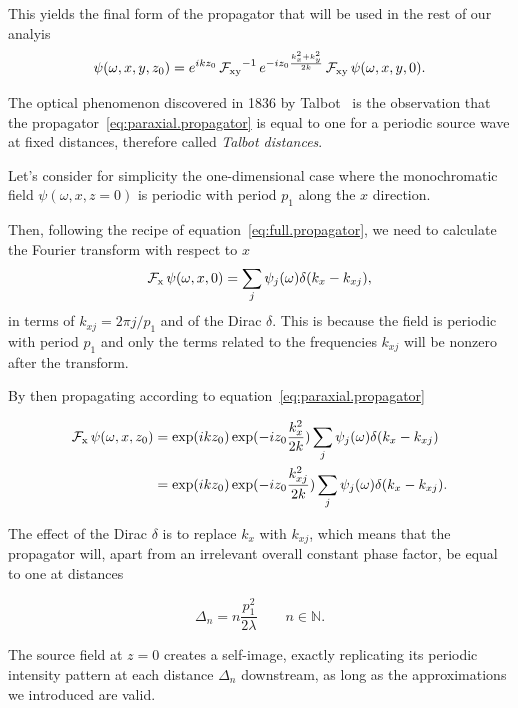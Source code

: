 This yields the final form of the propagator that will be used in the rest
of our analyis
\begin{equation}
    \psi(\omega, x, y, z_0) = e^{i k z_0}\operatorname{\mathcal{F}_{xy}}^{-1}e^{-i z_0\frac{k_x^2 +
    k_y^2}{2k}}\operatorname{\mathcal{F}_{xy}}\psi(\omega, x, y, 0). \label{eq:paraxial.propagator}
\end{equation}

The optical phenomenon discovered in 1836 by Talbot~\cite{Talbot1836} is the observation that
the propagator~\eqref{eq:paraxial.propagator} is equal to one for a periodic
source wave at fixed distances, therefore called \emph{Talbot distances}.

Let's consider for simplicity the one-dimensional case where the
monochromatic field $\psi(\omega, x, z=0)$ is periodic with period $p_1$
along the $x$ direction. 

Then, following the recipe of equation~\eqref{eq:full.propagator}, we need
to calculate the Fourier transform with respect to $x$
\begin{equation*}
    \operatorname{\mathcal{F}_{x}}\psi(\omega, x, 0) = \sum_j \psi_j(\omega)\delta(k_x -
    k_{xj}),
\end{equation*}
in terms of $k_{xj} = 2\pi j/ p_1$ and of the Dirac $\delta$. This is
because the field is periodic with period $p_1$ and only the terms related
to the frequencies $k_{xj}$ will be nonzero after the transform.

By then propagating according to equation~\eqref{eq:paraxial.propagator}

\begin{align}
    \operatorname{\mathcal{F}_{x}}\psi(\omega, x, z_0) &= \exp(ikz_0)\exp(-i z_0\frac{k_x^2}{2k})\sum_j \psi_j(\omega)\delta(k_x -
    k_{xj}) \\
    &= \exp(ikz_0)\exp(-i z_0\frac{k_{xj}^2}{2k})\sum_j \psi_j(\omega)\delta(k_x -
    k_{xj}).
    \label{eq:talbot1}
\end{align}

The effect of the Dirac $\delta$ is to replace $k_x$ with $k_{xj}$, which
means that the propagator will, apart from an irrelevant overall constant phase
factor, be equal to one at distances

\begin{equation}
    \Delta_n = n \frac{p_1^2}{2 \lambda} \qquad n \in
    \mathbb{N}.\label{eq:talbot.distance}
\end{equation}

The source field at $z = 0$ creates a
self-image, exactly replicating its periodic intensity pattern at each
distance $\Delta_n$ downstream, as long as the approximations we introduced
are valid.

